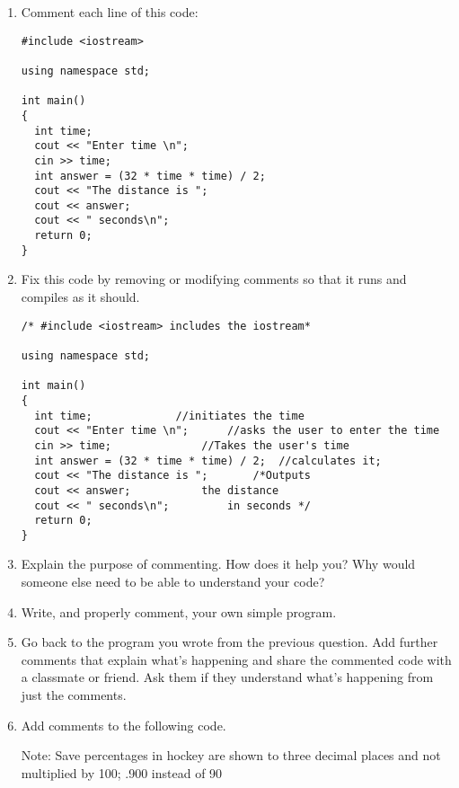 \begin{enumerate}
\item Comment each line of this code:

\noindent\begin{minipage}{\linewidth}\begin{lstlisting}
#include <iostream>

using namespace std;

int main()
{
  int time;
  cout << "Enter time \n";
  cin >> time;
  int answer = (32 * time * time) / 2;
  cout << "The distance is ";
  cout << answer;
  cout << " seconds\n";
  return 0;
}
\end{lstlisting}\end{minipage}

\item Fix this code by removing or modifying comments so that it runs and compiles as it should.

\noindent\begin{minipage}{\linewidth}\begin{lstlisting}
/* #include <iostream> includes the iostream*

using namespace std;

int main()
{
  int time;				//initiates the time 
  cout << "Enter time \n"; 		//asks the user to enter the time
  cin >> time; 				//Takes the user's time
  int answer = (32 * time * time) / 2;	//calculates it;
  cout << "The distance is "; 		/*Outputs
  cout << answer;			the distance
  cout << " seconds\n";			in seconds */
  return 0;
}
\end{lstlisting}\end{minipage}

\item Explain the purpose of commenting. How does it help you? Why would someone else need to be able to understand your code?

\item Write, and properly comment, your own simple program.

\item Go back to the program you wrote from the previous question. Add further comments that explain what's happening and share the commented code with a classmate or friend. Ask them if they understand what's happening from just the comments.

\item Add comments to the following code.

Note: Save percentages in hockey are shown to three decimal places and not multiplied by 100; .900 instead of 90%


\end{enumerate}
